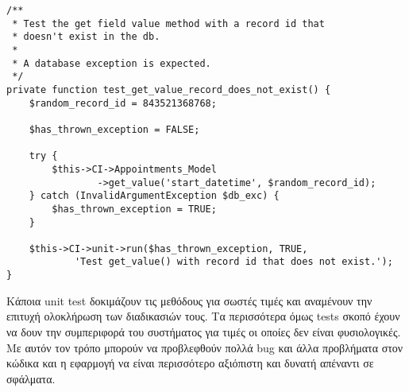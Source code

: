 \begingroup
\fontsize{10pt}{12pt}
\begin{verbatim}
/**
 * Test the get field value method with a record id that
 * doesn't exist in the db.
 * 
 * A database exception is expected.
 */
private function test_get_value_record_does_not_exist() {
    $random_record_id = 843521368768;
        
    $has_thrown_exception = FALSE;
        
    try {
        $this->CI->Appointments_Model
				->get_value('start_datetime', $random_record_id);
    } catch (InvalidArgumentException $db_exc) {
        $has_thrown_exception = TRUE;
    }
        
    $this->CI->unit->run($has_thrown_exception, TRUE, 
			'Test get_value() with record id that does not exist.');
}
\end{verbatim}
\endgroup

Κάποια unit test δοκιμάζουν τις μεθόδους για σωστές τιμές και αναμένουν την επιτυχή ολοκλήρωση των διαδικασιών τους. Τα περισσότερα όμως tests σκοπό έχουν να δουν την συμπεριφορά του συστήματος για τιμές οι οποίες δεν είναι φυσιολογικές. Με αυτόν τον τρόπο μπορούν να προβλεφθούν πολλά bug και άλλα προβλήματα στον κώδικα και η εφαρμογή να είναι περισσότερο αξιόπιστη και δυνατή απέναντι σε σφάλματα.